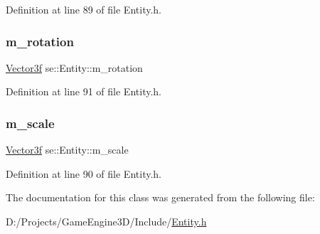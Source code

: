 Definition at line 89 of file Entity.\+h.

\mbox{\label{classse_1_1_entity_ad1cfc08dd4df9fe2a2633a6c2cd3e402}} 
\subsubsection{\texorpdfstring{m\+\_\+rotation}{m\_rotation}}
{\footnotesize\ttfamily \mbox{\hyperlink{namespacese_a12e07512d95e2fdebdaf74a5ea2cf5f6}{Vector3f}} se\+::\+Entity\+::m\+\_\+rotation\hspace{0.3cm}{\ttfamily [protected]}}



Definition at line 91 of file Entity.\+h.

\mbox{\label{classse_1_1_entity_a9c2c8636093982abc56960b947958b34}} 
\subsubsection{\texorpdfstring{m\+\_\+scale}{m\_scale}}
{\footnotesize\ttfamily \mbox{\hyperlink{namespacese_a12e07512d95e2fdebdaf74a5ea2cf5f6}{Vector3f}} se\+::\+Entity\+::m\+\_\+scale\hspace{0.3cm}{\ttfamily [protected]}}



Definition at line 90 of file Entity.\+h.



The documentation for this class was generated from the following file\+:\begin{DoxyCompactItemize}
\item 
D\+:/\+Projects/\+Game\+Engine3\+D/\+Include/\mbox{\hyperlink{_entity_8h}{Entity.\+h}}\end{DoxyCompactItemize}
